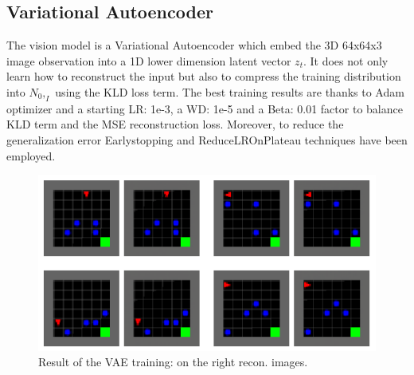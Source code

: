 \documentclass{article}
\begin{document}
\subsection{Variational Autoencoder}
The vision model is a Variational Autoencoder which embed the 3D 64x64x3 image observation into a 1D lower dimension latent vector $z_t$. It does not only learn how to reconstruct the input but also to compress the training distribution into $N_0,_I$ using the KLD loss term. 
The best training results are thanks to Adam optimizer and a starting LR: 1e-3, a WD: 1e-5 and a Beta: 0.01 factor to balance KLD term and the MSE reconstruction loss. Moreover, to reduce the generalization error Earlystopping and ReduceLROnPlateau techniques have been employed.
\begin{figure}[h!]
    \centerline{\includegraphics[scale=0.5]{./imgs/vae_results.png}}
    \caption{\label{baseline}
    Result of the VAE training: on the right recon. images.}
    \label{fig:vae}
\end{figure}
\end{document}
